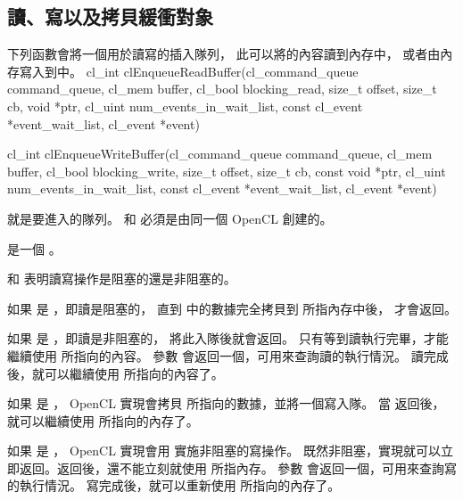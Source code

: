 \subsection{讀、寫以及拷貝緩衝對象}

下列函數會將一個用於讀寫的插入隊列，
此可以將的內容讀到內存中，
或者由內存寫入到中。
\startclc
cl_int clEnqueueReadBuffer(cl_command_queue command_queue,
			cl_mem buffer,
			cl_bool blocking_read,
			size_t offset,
			size_t cb,
			void *ptr,
			cl_uint num_events_in_wait_list,
			const cl_event *event_wait_list,
			cl_event *event)

cl_int clEnqueueWriteBuffer(cl_command_queue command_queue,
			cl_mem buffer,
			cl_bool blocking_write,
			size_t offset,
			size_t cb,
			const void *ptr,
			cl_uint num_events_in_wait_list,
			const cl_event *event_wait_list,
			cl_event *event)
\stopclc

 就是要進入的隊列。
 和  必須是由同一個 OpenCL 創建的。

 是一個 。

 和  表明讀寫操作是{\ftRef 阻塞}的還是{\ftRef 非阻塞}的。

如果  是 ，即讀是阻塞的，
直到  中的數據完全拷貝到  所指內存中後，  才會返回。

如果  是 ，即讀是非阻塞的，  將此入隊後就會返回。
只有等到讀執行完畢，才能繼續使用  所指向的內容。
參數  會返回一個，可用來查詢讀的執行情況。
讀完成後，就可以繼續使用  所指向的內容了。

如果  是 ， OpenCL 實現會拷貝  所指向的數據，並將一個寫入隊。
當  返回後，就可以繼續使用  所指向的內存了。

如果  是 ， OpenCL 實現會用  實施非阻塞的寫操作。
既然非阻塞，實現就可以立即返回。返回後，還不能立刻就使用  所指內存。
參數  會返回一個，可用來查詢寫的執行情況。
寫完成後，就可以重新使用  所指向的內存了。

